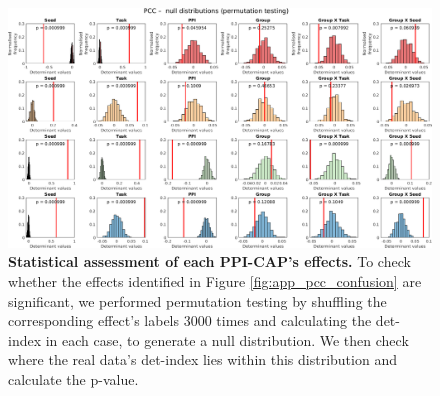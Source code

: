 \begin{figure}[h]
\centering
\includegraphics[width=1\textwidth]{images/Appendix/PCCK4_stats_permutation.png}
\vspace{5mm}
\caption{\textbf{Statistical assessment of each PPI-CAP's effects.} To check whether the effects identified in Figure \ref{fig:app_pcc_confusion} are significant, we performed permutation testing by shuffling the corresponding effect's labels 3000 times and calculating the det-index in each case, to generate a null distribution. We then check where the real data's det-index lies within this distribution and calculate the p-value. }
\label{fig:app_pcc_stats}
\end{figure}